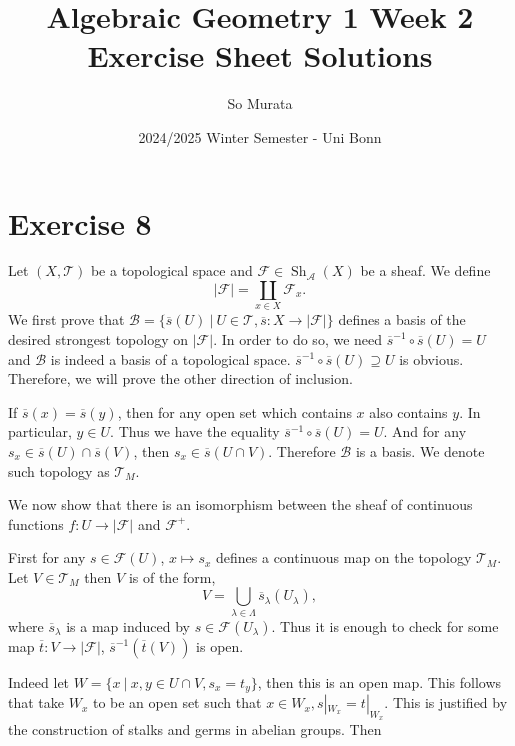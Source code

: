 \documentclass{article}
\title{Algebraic Geometry 1 Week 2 Exercise Sheet Solutions}
\author{So Murata}
\date{2024/2025 Winter Semester - Uni Bonn}
\DeclareMathOperator{\Sh}{Sh}
\begin{document}
\maketitle
\section*{Exercise 8}

Let $(X,\mathcal{T})$ be a topological space and $\mathcal{F}\in\Sh_{\mathcal{A}}(X)$ be a sheaf. We define
\begin{equation*}
\vert\mathcal{F}\vert = \coprod_{x\in X}\mathcal{F}_x.
\end{equation*}
We first prove that $\mathcal{B}=\{\overline{s}(U)\:|\: U\in\mathcal{T}, \overline{s}:X\to\vert\mathcal{F}\vert\}$ defines a basis of the desired strongest topology on $\vert\mathcal{F}\vert$.
In order to do so, we need $\overline{s}^{-1}\circ\overline{s}(U)= U$ and $\mathcal{B}$ is indeed a basis of a topological space. $\overline{s}^{-1}\circ\overline{s}(U)\supseteq U$ is obvious. Therefore, we will prove the other direction of inclusion.\\
\par If $\overline{s}(x) = \overline{s}(y)$, then for any open set which contains $x$ also contains $y$. In particular, $y\in U$. Thus we have the equality $\overline{s}^{-1}\circ\overline{s}(U)= U$. And for any $s_x\in \overline{s}(U)\cap\overline{s}(V)$, then $s_x\in\overline{s}(U\cap V)$. Therefore $\mathcal{B}$ is a basis. We denote such topology as $\mathcal{T}_M$.\\
\par We now show that there is an isomorphism between the sheaf of continuous functions $f:U\to\vert\mathcal{F}\vert$ and $\mathcal{F}^+$.\\
\par First for any $s\in\mathcal{F}(U)$, $x\mapsto s_x$ defines a continuous map on the topology $\mathcal{T}_M$. Let $V\in\mathcal{T}_M$ then $V$ is of the form,
\begin{equation*}
V = \bigcup_{\lambda\in\Lambda}\overline{s}_\lambda(U_\lambda),
\end{equation*}
where $\overline{s}_\lambda$ is a map induced by $s\in\mathcal{F}(U_\lambda)$. Thus it is enough to check for some map $\overline{t}:V\to\vert\mathcal{F}\vert$, $\overline{s}^{-1}(\overline{t}(V))$ is open. \\
\par Indeed let $W = \{x\:|\: x,y\in U\cap V, s_x=t_y\}$, then this is an open map. This follows that take $W_x$ to be an open set such that $x\in W_x, s|_{W_x}=t|_{W_x}$. This is justified by the construction of stalks and germs in abelian groups. Then
\end{document}
